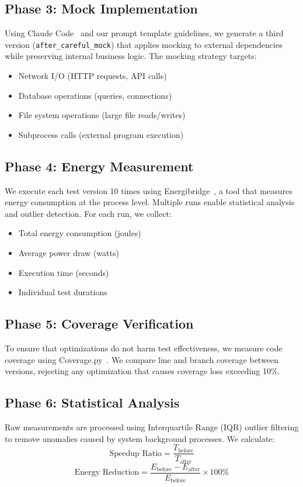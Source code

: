 \documentclass{article} %
\begin{document}
\subsection{Phase 3: Mock Implementation}
Using Claude Code~\cite{claude_code} and our prompt template guidelines, we generate a third version (\texttt{after\_careful\_mock}) that applies mocking to external dependencies while preserving internal business logic. The mocking strategy targets:
\begin{itemize}
    \item Network I/O (HTTP requests, API calls)
    \item Database operations (queries, connections)
    \item File system operations (large file reads/writes)
    \item Subprocess calls (external program execution)
\end{itemize}

\subsection{Phase 4: Energy Measurement}
We execute each test version 10 times using Energibridge~\cite{energibridge}, a tool that measures energy consumption at the process level. Multiple runs enable statistical analysis and outlier detection. For each run, we collect:
\begin{itemize}
    \item Total energy consumption (joules)
    \item Average power draw (watts)
    \item Execution time (seconds)
    \item Individual test durations
\end{itemize}

\subsection{Phase 5: Coverage Verification}
To ensure that optimizations do not harm test effectiveness, we measure code coverage using Coverage.py~\cite{coverage_py}. We compare line and branch coverage between versions, rejecting any optimization that causes coverage loss exceeding 10\%.

\subsection{Phase 6: Statistical Analysis}
Raw measurements are processed using Interquartile Range (IQR) outlier filtering to remove anomalies caused by system background processes. We calculate:
\begin{equation}
    \text{Speedup Ratio} = \frac{T_{\text{before}}}{T_{\text{after}}}
\end{equation}
\begin{equation}
    \text{Energy Reduction} = \frac{E_{\text{before}} - E_{\text{after}}}{E_{\text{before}}} \times 100\%
\end{equation}
\end{document}
